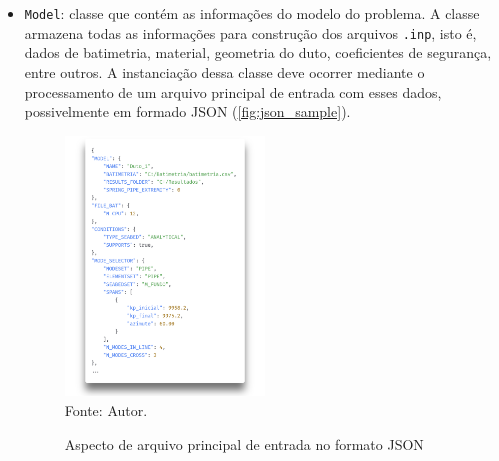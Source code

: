 \begin{itemize}
    \item \texttt{Model}: classe que contém as informações do modelo do problema.
    A classe armazena todas as informações para construção dos arquivos \texttt{.inp}, isto é, dados de batimetria, material, geometria do duto, coeficientes de segurança, entre outros.
    A instanciação dessa classe deve ocorrer mediante o processamento de um arquivo principal de entrada com esses dados, possivelmente em formado JSON (\autoref{fig:json_sample}).

    \begin{figure}[!ht]
        \centering
        \caption{Aspecto de arquivo principal de entrada no formato JSON}\label{fig:json_sample}
        \includegraphics[width=0.5\textwidth]{imagens/json_sample}
        \\Fonte: Autor.
    \end{figure}
    


\end{itemize}
